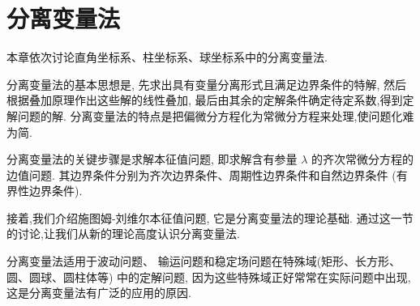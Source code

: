 \chapter{分离变量法}

本章依次讨论直角坐标系、柱坐标系、球坐标系中的分离变量法.

分离变量法的基本思想是, 
先求出具有变量分离形式且满足边界条件的特解,
然后根据叠加原理作出这些解的线性叠加, 
最后由其余的定解条件确定待定系数,得到定解问题的解.
分离变量法的特点是把偏微分方程化为常微分方程来处理,使问题化难为简.

分离变量法的关键步骤是求解本征值问题, 
即求解含有参量 $\lambda$ 的齐次常微分方程的边值问题. 
其边界条件分别为齐次边界条件、周期性边界条件和自然边界条件
(有界性边界条件).

接着,我们介绍施图姆-刘维尔本征值问题, 
它是分离变量法的理论基础. 
通过这一节的讨论,让我们从新的理论高度认识分离变量法.

分离变量法适用于波动问题、
输运问题和稳定场问题在特殊域(矩形、长方形、圆、圆球、圆柱体等) 
中的定解问题, 因为这些特殊域正好常常在实际问题中出现,
这是分离变量法有广泛的应用的原因.



